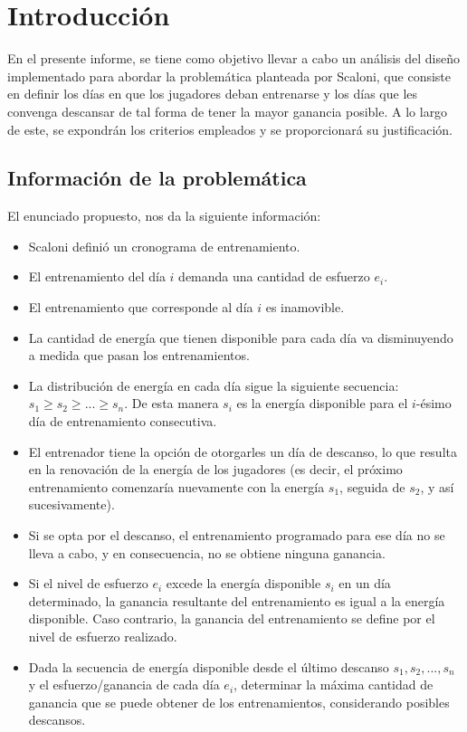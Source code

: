 \section{Introducción}

En el presente informe, se tiene como objetivo llevar a cabo un análisis del diseño 
implementado para abordar la problemática planteada por Scaloni, que consiste en 
definir los días en que los jugadores deban entrenarse y los días que les convenga descansar
de tal forma de tener la mayor ganancia posible. A lo largo de este, se expondrán los criterios
empleados y se proporcionará su justificación.


\subsection{Información de la problemática}

El enunciado propuesto, nos da la siguiente información:

\begin{itemize}
    \item Scaloni definió un cronograma de entrenamiento.
    \item El entrenamiento del día $i$ demanda una cantidad de esfuerzo $e_i$.
    \item El entrenamiento que corresponde al día $i$ es inamovible.
    \item  La cantidad de energía que tienen disponible para cada día va disminuyendo a medida que pasan
    los entrenamientos.
    \item La distribución de energía en cada día sigue la siguiente secuencia:  $s_1 \geq s_2 \geq ... \geq s_n$. De esta manera
    $s_i$ es la energía disponible para el $i$-ésimo día de entrenamiento consecutiva.
    \item El entrenador tiene la opción de otorgarles un día de descanso, lo que resulta en la renovación de la 
    energía de los jugadores (es decir, el próximo entrenamiento comenzaría nuevamente con la energía $s_1$, seguida
    de $s_2$, y así sucesivamente). 
    \item Si se opta por el descanso, el entrenamiento programado para ese día no se lleva a cabo, y en consecuencia, 
    no se obtiene ninguna ganancia.
    \item Si el nivel de esfuerzo $e_i$ excede la energía disponible $s_i$ en un día determinado,
     la ganancia resultante del entrenamiento es igual a la energía disponible. Caso contrario, la ganancia del entrenamiento se 
     define por el nivel de esfuerzo realizado.
    \item Dada la secuencia de energía disponible desde el último descanso $s_1 , s_2 ,..., s_n$ y el esfuerzo/ganancia de cada día 
     $e_i$, determinar la máxima cantidad de ganancia que se puede obtener de los entrenamientos, considerando posibles descansos.
\end{itemize}
